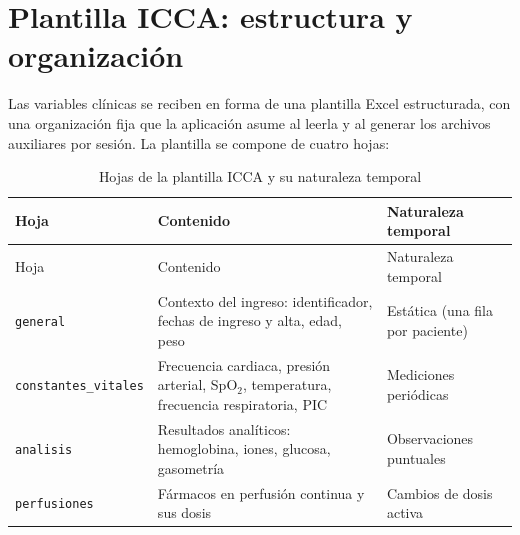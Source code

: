 \documentclass[
  spanish,
  a4paper,
  12pt,
  twoside]{memoir}
\begin{document}
\chapter{Plantilla ICCA: estructura y
organización}\label{plantilla-icca-estructura-y-organizaciuxf3n}

Las variables clínicas se reciben en forma de una plantilla Excel
estructurada, con una organización fija que la aplicación asume al
leerla y al generar los archivos auxiliares por sesión. La plantilla se
compone de cuatro hojas:

\begin{longtable}[]{@{}
  >{\raggedright\arraybackslash}p{}
  >{\raggedright\arraybackslash}p{}
  >{\raggedright\arraybackslash}p{}@{}}
\caption{Hojas de la plantilla ICCA y su naturaleza
temporal}\label{tbl-hojas-icca}\tabularnewline
\toprule\noalign{}
\begin{minipage}[b]{\linewidth}\raggedright
Hoja
\end{minipage} & \begin{minipage}[b]{\linewidth}\raggedright
Contenido
\end{minipage} & \begin{minipage}[b]{\linewidth}\raggedright
Naturaleza temporal
\end{minipage} \\
\midrule\noalign{}
\endfirsthead
\toprule\noalign{}
\begin{minipage}[b]{\linewidth}\raggedright
Hoja
\end{minipage} & \begin{minipage}[b]{\linewidth}\raggedright
Contenido
\end{minipage} & \begin{minipage}[b]{\linewidth}\raggedright
Naturaleza temporal
\end{minipage} \\
\midrule\noalign{}
\endhead
\bottomrule\noalign{}
\endlastfoot
\texttt{general} & Contexto del ingreso: identificador, fechas de
ingreso y alta, edad, peso & Estática (una fila por paciente) \\
\texttt{constantes\_vitales} & Frecuencia cardiaca, presión arterial,
SpO\(_2\), temperatura, frecuencia respiratoria, PIC & Mediciones
periódicas \\
\texttt{analisis} & Resultados analíticos: hemoglobina, iones, glucosa,
gasometría & Observaciones puntuales \\
\texttt{perfusiones} & Fármacos en perfusión continua y sus dosis &
Cambios de dosis activa \\
\end{longtable}
\end{document}
